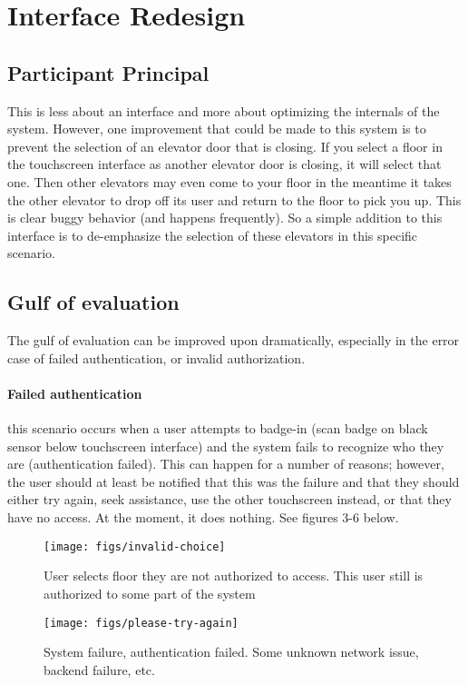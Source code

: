 \section{Interface Redesign}

\subsection{Participant Principal}
This is less about an interface and more about optimizing the internals of the system. However, one  improvement that could be made to this system is to prevent the selection of an elevator door that is closing. If you select a floor in the touchscreen interface as another elevator door is closing, it will select that one. Then other elevators may even come to your floor in the meantime it takes the other elevator to drop off its user and return to the floor to pick you up. This is clear buggy behavior (and happens frequently). So a simple addition to this interface is to de-emphasize the selection of these elevators in this specific scenario.

\subsection{Gulf of evaluation}
The gulf of evaluation can be improved upon dramatically, especially in the error case of failed authentication, or invalid authorization.

\paragraph{Failed authentication} this scenario occurs when a user attempts to badge-in (scan badge on black sensor below touchscreen interface) and the system fails to recognize who they are (authentication failed). This can happen for a number of reasons; however, the user should at least be notified that this was the failure and that they should either try again, seek assistance, use the other touchscreen instead, or that they have no access. At the moment, it does nothing. See figures 3-6 below.

\begin{figure}[H]
  \centering
  \texttt{[image: figs/invalid-choice]}
  \caption{User selects floor they are not authorized to access. This user still is authorized to some part of the system}
  \label{fig::1}
\end{figure}

\begin{figure}[H]
  \centering
  \texttt{[image: figs/please-try-again]}
  \caption{System failure, authentication failed. Some unknown network issue, backend failure, etc.}
  \label{fig::1}
\end{figure}

